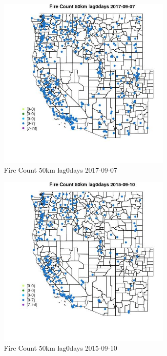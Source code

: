 \begin{figure} 
\centering  
\includegraphics[width=0.77\textwidth]{Code_Outputs/Report_ML_input_PM25_Step4_part_e_de_duplicated_aves_compiled_2019-05-21wNAs_MapObsFire_Count_50km_lag0days2017-09-07.jpg} 
\caption{\label{fig:Report_ML_input_PM25_Step4_part_e_de_duplicated_aves_compiled_2019-05-21wNAsMapObsFire_Count_50km_lag0days2017-09-07}Fire Count 50km lag0days 2017-09-07} 
\end{figure} 
 

\begin{figure} 
\centering  
\includegraphics[width=0.77\textwidth]{Code_Outputs/Report_ML_input_PM25_Step4_part_e_de_duplicated_aves_compiled_2019-05-21wNAs_MapObsFire_Count_50km_lag0days2015-09-10.jpg} 
\caption{\label{fig:Report_ML_input_PM25_Step4_part_e_de_duplicated_aves_compiled_2019-05-21wNAsMapObsFire_Count_50km_lag0days2015-09-10}Fire Count 50km lag0days 2015-09-10} 
\end{figure} 
 

